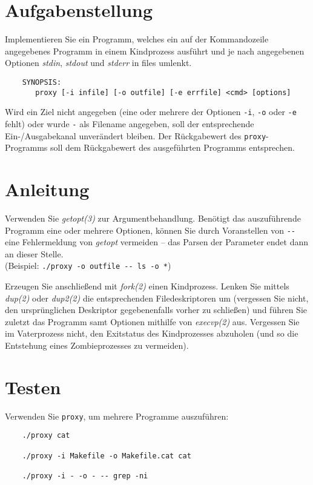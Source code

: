 




\section*{Aufgabenstellung}

Implementieren Sie ein Programm, welches ein auf der Kommandozeile angegebenes
Programm in einem Kindprozess ausführt und je nach angegebenen Optionen 
\emph{stdin}, \emph{stdout} und \emph{stderr} in files umlenkt.

\begin{verbatim}
    SYNOPSIS:
       proxy [-i infile] [-o outfile] [-e errfile] <cmd> [options]
\end{verbatim}

Wird ein Ziel nicht angegeben (eine oder mehrere der Optionen \verb_-i_,
\verb_-o_ oder \verb_-e_ fehlt) oder wurde \verb_-_ als Filename angegeben, soll
der entsprechende Ein-/Ausgabekanal unverändert bleiben. Der Rückgabewert des
\verb_proxy_-Programms soll dem Rückgabewert des ausgeführten Programms
entsprechen.

\section*{Anleitung}

Verwenden Sie \emph{getopt(3)} zur Argumentbehandlung. Benötigt das
auszuführende Programm eine oder mehrere Optionen, können Sie durch Voranstellen
von \verb|--| eine Fehlermeldung von {\em getopt} vermeiden – das Parsen der
Parameter endet dann an dieser Stelle.\\
(Beispiel: \verb|./proxy -o outfile -- ls -o *|)

Erzeugen Sie anschließend mit \emph{fork(2)} einen Kindprozess. Lenken Sie
mittels \emph{dup(2)} oder \emph{dup2(2)} die entsprechenden Filedeskriptoren um
(vergessen Sie nicht, den ursprünglichen Deskriptor gegebenenfalls vorher zu
schließen) und führen Sie zuletzt das Programm samt Optionen mithilfe von
\emph{execvp(2)} aus. Vergessen Sie im Vaterprozess nicht, den Exitstatus des
Kindprozesses abzuholen (und so die Entstehung eines Zombieprozesses zu
vermeiden).

\section*{Testen}

Verwenden Sie \verb_proxy_, um mehrere Programme auszuführen:

\begin{verbatim}
	./proxy cat
	
	./proxy -i Makefile -o Makefile.cat cat

	./proxy -i - -o - -- grep -ni
\end{verbatim}

\osueguidelinestwo


